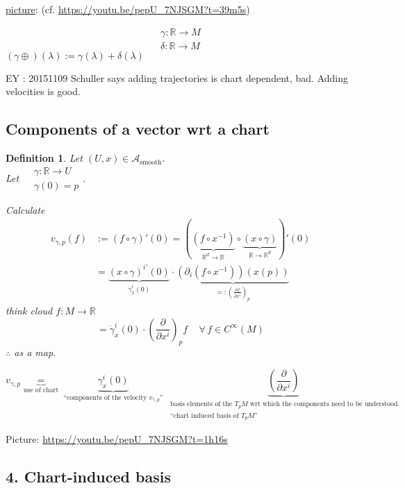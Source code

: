 \documentclass[10pt, twoside]{amsart}
\newtheorem{definition}{Definition}
\begin{document}
\begin{multicols*}{2}
\underline{picture}: (cf. \url{https://youtu.be/pepU_7NJSGM?t=39m5s})

\[
\begin{aligned} 
  \gamma : \mathbb{R} \to M \\
  \delta : \mathbb{R} \to M \end{aligned}
\]
$(\gamma \oplus)(\lambda) := \gamma(\lambda) + \delta(\lambda)$

EY : 20151109 Schuller says adding trajectories is chart dependent, bad. Adding velocities is good.  
\subsection{Components of a vector wrt a chart}

\begin{definition}
  Let $(U,x) \in \mathcal{A}_{\text{smooth}}$.  \\
  Let $\begin{aligned} & \gamma : \mathbb{R} \to U \\ 
    & \gamma(0) = p \end{aligned}$.  

Calculate 
\[
\begin{aligned} 
  v_{\gamma,p}(f) & := (f \circ \gamma)'(0) = (\underbrace{ (f\circ x^{-1}) }_{\mathbb{R}^d \to \mathbb{R} }  \circ \underbrace{ (x\circ \gamma)}_{\mathbb{R} \to \mathbb{R}^d}  )'(0) \\
  & = \underbrace{ (x\circ \gamma)^{i'}(0) }_{\dot{\gamma}_x^i(0) }  \cdot \underbrace{ (\partial_i(f\circ x^{-1} ) )(x(p))  }_{ =: \left( \frac{ \partial f}{ \partial x^i } \right)_p }
\end{aligned}
\]
think cloud $f:M\to \mathbb{R}$
\[
 = \boxed{ \dot{\gamma}_x^i(0) \cdot \left( \frac{ \partial }{ \partial x^i} \right)_p } f \quad \, \forall \, f \in C^{\infty}(M)
\]
$\therefore$ as a map.  

\[
v_{\gamma,p} \underbrace{=}_{\text{use of chart} } \underbrace{ \gamma_x^i(0) }_{ \text{ ``components of the velocity $v_{\gamma,p}$'' } } \underbrace{ \left( \frac{ \partial }{ \partial x^i} \right)}_{ \substack{ \text{ basis elements of the $T_pM$ wrt which the components need to be understood.} \\
\text{ ``chart induced basis of $T_pM$''} } } 
\]
\end{definition}

Picture: \url{https://youtu.be/pepU_7NJSGM?t=1h16s}

\subsection{4. Chart-induced basis}


\end{multicols*}
\end{document}
